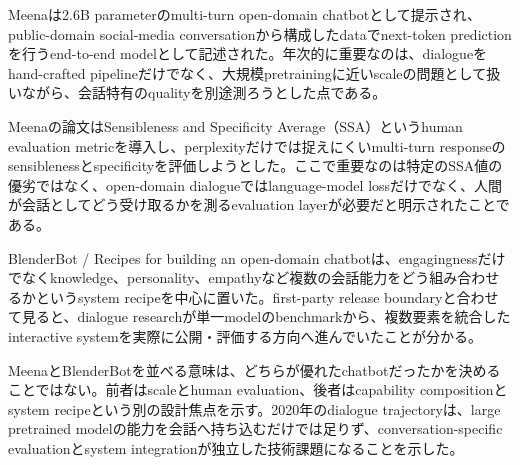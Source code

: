 Meenaは2.6B parameterのmulti-turn open-domain chatbotとして提示され、public-domain social-media conversationから構成したdataでnext-token predictionを行うend-to-end modelとして記述された。年次的に重要なのは、dialogueをhand-crafted pipelineだけでなく、大規模pretrainingに近いscaleの問題として扱いながら、会話特有のqualityを別途測ろうとした点である。\autocite{src-8930f1933983}


Meenaの論文はSensibleness and Specificity Average（SSA）というhuman evaluation metricを導入し、perplexityだけでは捉えにくいmulti-turn responseのsensiblenessとspecificityを評価しようとした。ここで重要なのは特定のSSA値の優劣ではなく、open-domain dialogueではlanguage-model lossだけでなく、人間が会話としてどう受け取るかを測るevaluation layerが必要だと明示されたことである。\autocite{src-8930f1933983}


BlenderBot / Recipes for building an open-domain chatbotは、engagingnessだけでなくknowledge、personality、empathyなど複数の会話能力をどう組み合わせるかというsystem recipeを中心に置いた。first-party release boundaryと合わせて見ると、dialogue researchが単一modelのbenchmarkから、複数要素を統合したinteractive systemを実際に公開・評価する方向へ進んでいたことが分かる。\autocite{src-66cb10bf43ff,src-8260c320e205}


MeenaとBlenderBotを並べる意味は、どちらが優れたchatbotだったかを決めることではない。前者はscaleとhuman evaluation、後者はcapability compositionとsystem recipeという別の設計焦点を示す。2020年のdialogue trajectoryは、large pretrained modelの能力を会話へ持ち込むだけでは足りず、conversation-specific evaluationとsystem integrationが独立した技術課題になることを示した。\autocite{src-66cb10bf43ff,src-8260c320e205,src-8930f1933983}


